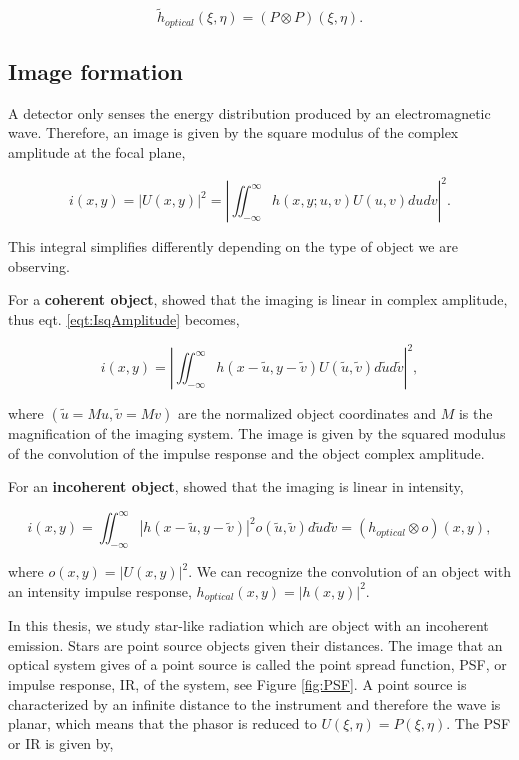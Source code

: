 \begin{equation}
\widetilde{h}_{optical}(\xi,\eta) = (P \otimes P)(\xi,\eta).
\label{eqt:}
\end{equation}


\subsection{Image formation}
\label{subsec:FromOtoI}

A detector only senses the energy distribution produced by an electromagnetic wave. Therefore, an image is given by the square modulus of the complex amplitude at the focal plane,

\begin{equation}
i(x,y) = |U(x,y)|^2 = |\iint_{-\infty}^{\infty} h(x,y;u,v)U(u,v)dudv|^2.
\label{eqt:IsqAmplitude}
\end{equation}

This integral simplifies differently depending on the type of object we are observing. 

For a \textbf{coherent object}, \citet[Chapter 6.2]{goodman_1968} showed that the imaging is linear in complex amplitude, thus eqt. \eqref{eqt:IsqAmplitude} becomes,

\begin{equation}
i(x,y) = |\iint_{-\infty}^{\infty} h(x-\widetilde{u},y-\widetilde{v})U(\widetilde{u},\widetilde{v})d\widetilde{u}d\widetilde{v}|^2,
\label{eqt:convolution_hUo}
\end{equation}

where $(\widetilde{u} = Mu,\widetilde{v}= Mv)$ are the normalized object coordinates and $M$ is the magnification of the imaging system. The image is given by the squared modulus of the convolution of the impulse response and the object complex amplitude.

For an \textbf{incoherent object},  \citet[Chapter 6.2]{goodman_1968} showed that the imaging is linear in intensity,

\begin{equation}
i(x,y) = \iint_{-\infty}^{\infty}|h(x-\widetilde{u},y-\widetilde{v})|^2o(\widetilde{u},\widetilde{v})d\widetilde{u}d\widetilde{v} = (h_{optical}\otimes o)(x,y),
\label{eqt:imageObjectrel}
\end{equation}

where $o(x,y) = |U(x,y)|^2$. We can recognize the convolution of an object with an intensity impulse response, $h_{optical}(x,y) = |h(x,y)|^2$.

In this thesis, we study star-like radiation which are object with an incoherent emission. Stars are point source objects given their distances. The image that an optical system gives of a point source is called the point spread function, PSF, or impulse response, IR, of the system, see Figure \ref{fig:PSF}. A point source is characterized by an infinite distance to the instrument and therefore the wave is planar, which means that the phasor is reduced to $U(\xi,\eta) = P(\xi,\eta)$. The PSF or IR is given by,

